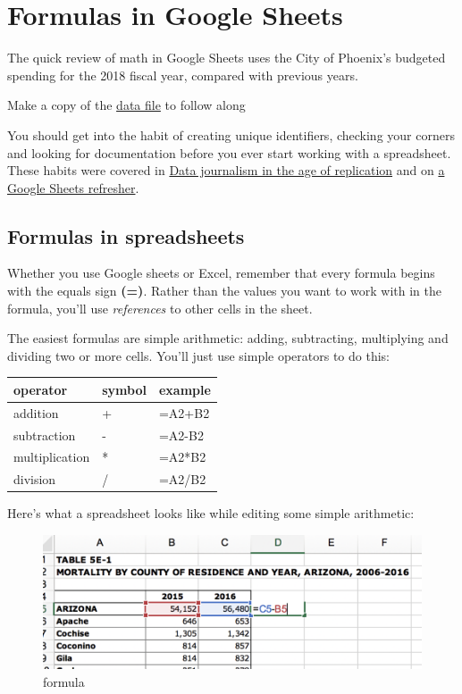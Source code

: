 \documentclass[
  letterpaper,
  DIV=11,
  numbers=noendperiod]{scrreprt}
\begin{document}
\hypertarget{xl-formulas}{%
\chapter{Formulas in Google Sheets}\label{xl-formulas}}

The quick review of math in Google Sheets uses the City of Phoenix's
budgeted spending for the 2018 fiscal year, compared with previous
years.

Make a copy of the
\href{https://docs.google.com/spreadsheets/d/1NGFHiJzvSsdB2wT7AehdSCjGrrwrOS1_rLk5FEaz7a8/edit?usp=sharing}{data
file} to follow along

You should get into the habit of creating unique identifiers, checking
your corners and looking for documentation before you ever start working
with a spreadsheet. These habits were covered in
\href{replication.html}{Data journalism in the age of replication} and
on \href{xl-refresher.html}{a Google Sheets refresher}.

\hypertarget{formulas-in-spreadsheets}{%
\section{Formulas in spreadsheets}\label{formulas-in-spreadsheets}}

Whether you use Google sheets or Excel, remember that every formula
begins with the equals sign \textbf{(=)}. Rather than the values you
want to work with in the formula, you'll use \emph{references} to other
cells in the sheet.

The easiest formulas are simple arithmetic: adding, subtracting,
multiplying and dividing two or more cells. You'll just use simple
operators to do this:

\begin{longtable}[]{@{}lll@{}}
\toprule()
operator & symbol & example \\
\midrule()
\endhead
addition & + & =A2+B2 \\
subtraction & - & =A2-B2 \\
multiplication & * & =A2*B2 \\
division & / & =A2/B2 \\
\bottomrule()
\end{longtable}

Here's what a spreadsheet looks like while editing some simple
arithmetic:

\begin{figure}

{\centering \includegraphics{./images/xl_mathreview_00.png}

}

\caption{formula}

\end{figure}
\end{document}
